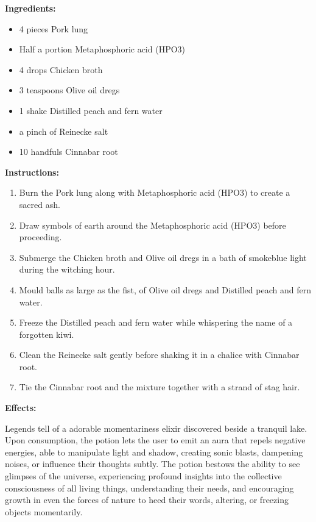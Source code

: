 \documentclass{article}
\begin{document}
\textbf{Ingredients:}

\begin{itemize}
  \item 4 pieces Pork lung
  \item Half a portion Metaphosphoric acid (HPO3)
  \item 4 drops Chicken broth
  \item 3 teaspoons Olive oil dregs
  \item 1 shake Distilled peach and fern water
  \item a pinch of Reinecke salt
  \item 10 handfuls Cinnabar root
\end{itemize}

\textbf{Instructions:}

\begin{enumerate}
  \item Burn the Pork lung along with Metaphosphoric acid (HPO3) to create a sacred ash.
  \item Draw symbols of earth around the Metaphosphoric acid (HPO3) before proceeding.
  \item Submerge the Chicken broth and Olive oil dregs in a bath of smokeblue light during the witching hour.
  \item Mould balls as large as the fist, of Olive oil dregs and Distilled peach and fern water.
  \item Freeze the Distilled peach and fern water while whispering the name of a forgotten kiwi.
  \item Clean the Reinecke salt gently before shaking it in a chalice with Cinnabar root.
  \item Tie the Cinnabar root and the mixture together with a strand of stag hair.
\end{enumerate}

\textbf{Effects:}

Legends tell of a adorable momentariness elixir discovered beside a tranquil lake. Upon consumption, the potion lets the user to emit an aura that repels negative energies, able to manipulate light and shadow, creating sonic blasts, dampening noises, or influence their thoughts subtly. The potion bestows the ability to see glimpses of the universe, experiencing profound insights into the collective consciousness of all living things, understanding their needs, and encouraging growth in even the forces of nature to heed their words, altering, or freezing objects momentarily.
\end{document}
